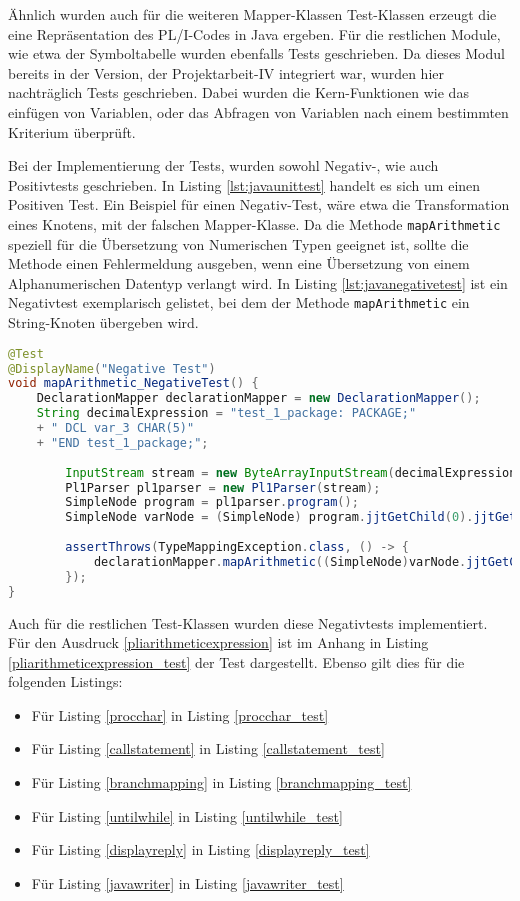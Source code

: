 Ähnlich wurden auch für die weiteren Mapper-Klassen Test-Klassen erzeugt die eine Repräsentation des PL/I-Codes in Java ergeben.
Für die restlichen Module, wie etwa der Symboltabelle wurden ebenfalls Tests geschrieben.
Da dieses Modul bereits in der Version, der Projektarbeit-IV integriert war, wurden hier nachträglich Tests geschrieben.
Dabei wurden die Kern-Funktionen wie das einfügen von Variablen, oder das Abfragen von Variablen nach einem bestimmten Kriterium überprüft. 

Bei der Implementierung der Tests, wurden sowohl Negativ-, wie auch Positivtests geschrieben.
In Listing \ref{lst:javaunittest} handelt es sich um einen Positiven Test. 
Ein Beispiel für einen Negativ-Test, wäre etwa die Transformation eines Knotens, mit der falschen Mapper-Klasse.
Da die Methode \verb+mapArithmetic+ speziell für die Übersetzung von Numerischen Typen geeignet ist,
sollte die Methode einen Fehlermeldung ausgeben, wenn eine Übersetzung von einem Alphanumerischen Datentyp verlangt wird.
In Listing \ref{lst:javanegativetest} ist ein Negativtest exemplarisch gelistet, bei dem der Methode \verb+mapArithmetic+
ein String-Knoten übergeben wird.

\begin{lstlisting}[language=Java, caption=Arithmetic Node Unit-test, label={lst:javanegativetest}]
@Test
@DisplayName("Negative Test")
void mapArithmetic_NegativeTest() {
	DeclarationMapper declarationMapper = new DeclarationMapper();
	String decimalExpression = "test_1_package: PACKAGE;" 
	+ "	DCL var_3 CHAR(5)" 
	+ "END test_1_package;";
	
		InputStream stream = new ByteArrayInputStream(decimalExpression.getBytes(StandardCharsets.UTF_8));
		Pl1Parser pl1parser = new Pl1Parser(stream);
		SimpleNode program = pl1parser.program();
		SimpleNode varNode = (SimpleNode) program.jjtGetChild(0).jjtGetChild(1);
		
		assertThrows(TypeMappingException.class, () -> {
			declarationMapper.mapArithmetic((SimpleNode)varNode.jjtGetChild(1).jjtGetChild(0));
		});
}
\end{lstlisting}

Auch für die restlichen Test-Klassen wurden diese Negativtests implementiert. 
Für den Ausdruck \ref{pliarithmeticexpression} ist im Anhang in Listing \ref{pliarithmeticexpression_test} der Test dargestellt. Ebenso gilt dies für die folgenden Listings:

\begin{itemize}
	\item Für Listing \ref{procchar} in Listing \ref{procchar_test}
	\item Für Listing \ref{callstatement} in Listing \ref{callstatement_test}
	\item Für Listing \ref{branchmapping} in Listing \ref{branchmapping_test}
	\item Für Listing \ref{untilwhile} in Listing \ref{untilwhile_test}
	\item Für Listing \ref{displayreply} in Listing \ref{displayreply_test}
	\item Für Listing \ref{javawriter} in Listing \ref{javawriter_test}
\end{itemize}

